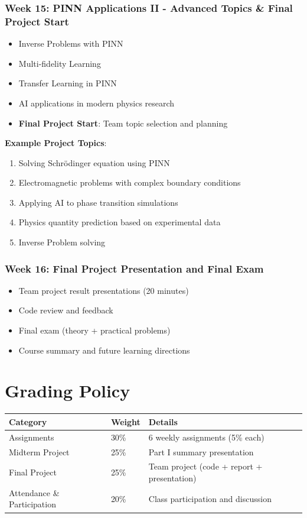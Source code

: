 \documentclass[11pt,a4paper]{article}
\begin{document}
\subsubsection*{Week 15: PINN Applications II - Advanced Topics \& Final Project Start}
\begin{itemize}[noitemsep]
    \item Inverse Problems with PINN
    \item Multi-fidelity Learning
    \item Transfer Learning in PINN
    \item AI applications in modern physics research
    \item \textbf{Final Project Start}: Team topic selection and planning
\end{itemize}

\textbf{Example Project Topics}:
\begin{enumerate}[noitemsep]
    \item Solving Schrödinger equation using PINN
    \item Electromagnetic problems with complex boundary conditions
    \item Applying AI to phase transition simulations
    \item Physics quantity prediction based on experimental data
    \item Inverse Problem solving
\end{enumerate}

\subsubsection*{Week 16: Final Project Presentation and Final Exam}
\begin{itemize}[noitemsep]
    \item Team project result presentations (20 minutes)
    \item Code review and feedback
    \item Final exam (theory + practical problems)
    \item Course summary and future learning directions
\end{itemize}

\newpage

\section{Grading Policy}

\begin{table}[h]
\centering
\begin{tabular}{@{}lll@{}}
\toprule
\textbf{Category} & \textbf{Weight} & \textbf{Details} \\ \midrule
Assignments & 30\% & 6 weekly assignments (5\% each) \\
Midterm Project & 25\% & Part I summary presentation \\
Final Project & 25\% & Team project (code + report + presentation) \\
Attendance \& Participation & 20\% & Class participation and discussion \\ \bottomrule
\end{tabular}
\end{table}
\end{document}

